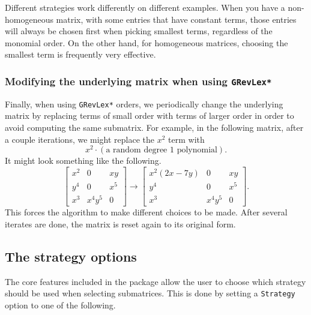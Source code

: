 \documentclass[11pt]{amsart}
\begin{document}
\begin{remark}
  Different strategies work differently on different examples.  When you have a non-homogeneous matrix, with some entries that have constant terms, those entries will always be chosen first when picking smallest terms, regardless of the monomial order.  On the other hand, for homogeneous matrices, choosing the smallest term is frequently very effective.
\end{remark}



\subsubsection{Modifying the underlying matrix when using {\tt GRevLex*}}
Finally, when using {\tt GRevLex*} orders, we periodically change the underlying matrix 
by replacing terms of small order with terms of larger order in order to avoid computing the same submatrix.  For example, in the following matrix, after 
a couple iterations, we might replace the $x^2$ term with 
\[x^2 \cdot (\text{a random degree 1 polynomial}). \]
It might look something like the following.
\[
  \left[\begin{array}{ccc}
    x^2 & 0 & xy \\
    y^4 & 0 & x^5 \\
    x^3 & x^4 y^5 & 0
  \end{array} \right]
  \rightarrow
  \left[\begin{array}{ccc}
    x^2 (2x-7y) & 0 & xy \\
    y^4 & 0 & x^5 \\
    x^3 & x^4 y^5 & 0
  \end{array} \right].
\]
This forces the algorithm to make different choices to be made.  After several iterates are done, the matrix is reset again to its original form.



\subsection{The strategy options}  
The core features included in the package allow the user to choose which 
strategy should be used when selecting submatrices. This is done by setting a 
{\tt Strategy} option to one of the following.  
\end{document}

